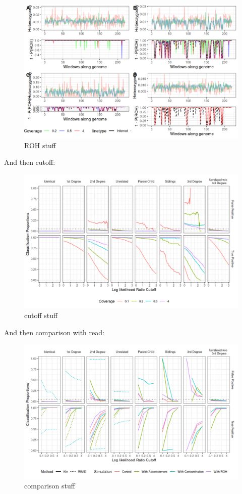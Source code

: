 \documentclass[12pt, letterpaper]{article}
\begin{document}
\begin{figure}[htp]
    \centering
    \includegraphics[width=18cm]{ROHplot.png}
    \caption{ROH stuff}
    \label{fig:galaxy}
\end{figure}


And then cutoff:
\begin{figure}[htp]
    \centering
    \includegraphics[width=18cm]{contam0_inbred0_model_performance_allroc_asc0_plot.png}
    \caption{cutoff stuff}
    \label{fig:galaxy}
\end{figure}

And then comparison with read:
\begin{figure}[htp]
    \centering
    \includegraphics[width=18cm]{comparison_plot.png}
    \caption{comparison stuff}
    \label{fig:galaxy}
\end{figure}
\end{document}
